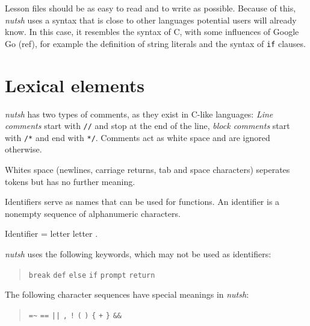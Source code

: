\documentclass[paper=a4,twoside,abstract=on,cleardoublepage=empty,numbers=noenddot,toc=bib,11pt,appendixprefix=true]{scrreprt}
\begin{document}
Lesson files should be as easy to read and to write as possible. Because of this, \emph{nutsh} uses a syntax that is close to other languages potential users will already know. In this case, it resembles the syntax of C, with some influences of Google Go (ref), for example the definition of string literals and the syntax of \texttt{if} clauses.

\section{Lexical elements}


\emph{nutsh} has two types of comments, as they exist in C-like languages: \emph{Line comments} start with \texttt{//} and stop at the end of the line, \emph{block comments} start with \texttt{/*} and end with \texttt{*/}. Comments act as white space and are ignored otherwise.


Whites space (newlines, carriage returns, tab and space characters) seperates tokens but has no further meaning.


Identifiers serve as names that can be used for functions. An identifier is a nonempty sequence of alphanumeric characters.

\begin{ebnf}
Identifier = letter { letter } .
\end{ebnf}


\emph{nutsh} uses the following keywords, which may not be used as identifiers:

\begin{quote}
    \texttt{break}\hspace{0.5em}
    \texttt{def}\hspace{0.5em}
    \texttt{else}\hspace{0.5em}
    \texttt{if}\hspace{0.5em}
    \texttt{prompt}\hspace{0.5em}
    \texttt{return}
\end{quote}


The following character sequences have special meanings in \emph{nutsh}:

\begin{quote}
    \texttt{=\~}\hspace{1em}
    \texttt{==}\hspace{1em}
    \texttt{||}\hspace{1em}
    \texttt{,}\hspace{1em}
    \texttt{!}\hspace{1em}
    \texttt{(}\hspace{1em}
    \texttt{)}\hspace{1em}
    \texttt{\{}\hspace{1em}
    \texttt{+}\hspace{1em}
    \texttt{\}}\hspace{1em}
    \texttt{\&\&}
\end{quote}
\end{document}
